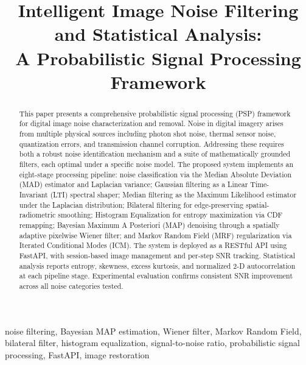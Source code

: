 \documentclass[10pt,conference]{IEEEtran}
\begin{document}
\title{Intelligent Image Noise Filtering and Statistical Analysis:\\A Probabilistic Signal Processing Framework}

\author{
}

\maketitle

\begin{abstract}
This paper presents a comprehensive probabilistic signal processing (PSP) framework for digital image noise characterization and removal. Noise in digital imagery arises from multiple physical sources including photon shot noise, thermal sensor noise, quantization errors, and transmission channel corruption. Addressing these requires both a robust noise identification mechanism and a suite of mathematically grounded filters, each optimal under a specific noise model. The proposed system implements an eight-stage processing pipeline: noise classification via the Median Absolute Deviation (MAD) estimator and Laplacian variance; Gaussian filtering as a Linear Time-Invariant (LTI) spectral shaper; Median filtering as the Maximum Likelihood estimator under the Laplacian distribution; Bilateral filtering for edge-preserving spatial-radiometric smoothing; Histogram Equalization for entropy maximization via CDF remapping; Bayesian Maximum A Posteriori (MAP) denoising through a spatially adaptive pixelwise Wiener filter; and Markov Random Field (MRF) regularization via Iterated Conditional Modes (ICM). The system is deployed as a RESTful API using FastAPI, with session-based image management and per-step SNR tracking. Statistical analysis reports entropy, skewness, excess kurtosis, and normalized 2-D autocorrelation at each pipeline stage. Experimental evaluation confirms consistent SNR improvement across all noise categories tested.
\end{abstract}

\begin{IEEEkeywords}
noise filtering, Bayesian MAP estimation, Wiener filter, Markov Random Field, bilateral filter, histogram equalization, signal-to-noise ratio, probabilistic signal processing, FastAPI, image restoration
\end{IEEEkeywords}
\end{document}
